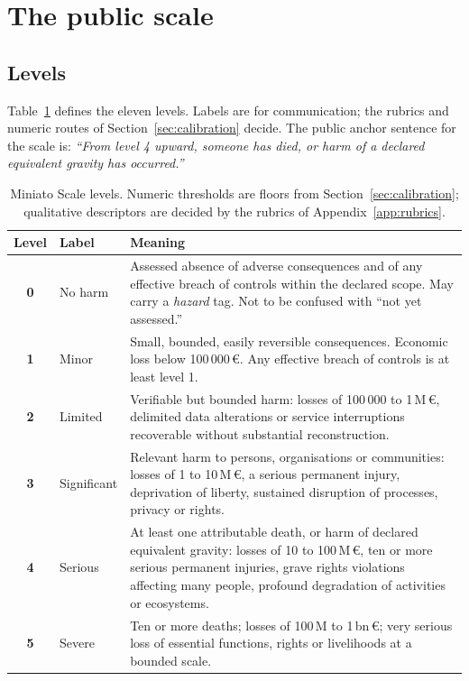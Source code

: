 \documentclass[11pt,a4paper]{article}
\newcommand{\lvl}[1]{\textsf{\textbf{#1}}}
\begin{document}
\section{The public scale}
\label{sec:scale}

\subsection{Levels}

Table~\ref{tab:levels} defines the eleven levels. Labels are for communication; the rubrics and numeric routes of Section~\ref{sec:calibration} decide. The public anchor sentence for the scale is: \emph{``From level 4 upward, someone has died, or harm of a declared equivalent gravity has occurred.''}

\begin{table}[ht]
\centering\small
\caption{Miniato Scale levels. Numeric thresholds are floors from Section~\ref{sec:calibration}; qualitative descriptors are decided by the rubrics of Appendix~\ref{app:rubrics}.}
\label{tab:levels}
\begin{tabularx}{\textwidth}{@{}c l X@{}}
\toprule
Level & Label & Meaning \\
\midrule
\lvl{0} & No harm & Assessed absence of adverse consequences and of any effective breach of controls within the declared scope. May carry a \emph{hazard} tag. Not to be confused with ``not yet assessed.'' \\
\lvl{1} & Minor & Small, bounded, easily reversible consequences. Economic loss below 100\,000\,\euro. Any effective breach of controls is at least level 1. \\
\lvl{2} & Limited & Verifiable but bounded harm: losses of 100\,000 to 1\,M\,\euro, delimited data alterations or service interruptions recoverable without substantial reconstruction. \\
\lvl{3} & Significant & Relevant harm to persons, organisations or communities: losses of 1 to 10\,M\,\euro, a serious permanent injury, deprivation of liberty, sustained disruption of processes, privacy or rights. \\
\lvl{4} & Serious & At least one attributable death, or harm of declared equivalent gravity: losses of 10 to 100\,M\,\euro, ten or more serious permanent injuries, grave rights violations affecting many people, profound degradation of activities or ecosystems. \\
\lvl{5} & Severe & Ten or more deaths; losses of 100\,M to 1\,bn\,\euro; very serious loss of essential functions, rights or livelihoods at a bounded scale. \\

\end{tabularx}
\end{table}
\end{document}
